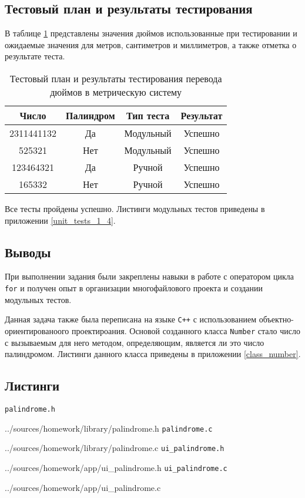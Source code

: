 \documentclass[12pt,a4paper]{report}
\begin{document}
\subsection{Тестовый план и результаты тестирования}
\hspace{\parindent}В таблице \ref{inch_to_cm_test_plan} представлены значения дюймов использованные при тестировании и ожидаемые значения для метров, сантиметров и миллиметров, а также отметка о результате теста.
\FloatBarrier
\begin{table}[h]
\caption{Тестовый план и результаты тестирования перевода дюймов в метрическую систему}
\label{inch_to_cm_test_plan}
\begin{tabular}{| c | c | c | c |}
\hline 
Число & Палиндром & Тип теста & Результат\\ 
\hline 
2311441132 & Да & Модульный & Успешно \\ 
\hline 
525321 & Нет & Модульный & Успешно \\ 
\hline 
123464321 & Да & Ручной & Успешно \\ 
\hline 
165332 & Нет & Ручной & Успешно \\ 
\hline 
\end{tabular} 
\end{table}
\FloatBarrier
Все тесты пройдены успешно. Листинги модульных тестов приведены в приложении \ref{unit_tests_1_4}.
\subsection{Выводы}
\hspace{\parindent}При выполнении задания были закреплены навыки в работе с оператором цикла \verb+for+ и получен опыт в организации многофайлового проекта и создании модульных тестов.

Данная задача также была переписана на языке \verb|C++| с использованием объектно-ориентированоого проектироания. Основой созданного класса \verb+Number+ стало число с вызываемым для него методом, определяющим, является ли это число палиндромом. Листинги данного класса приведены в приложении \ref{class_number}.

\newpage
\subsection{Листинги}
\verb+palindrome.h+

{../sources/homework/library/palindrome.h}
\verb+palindrome.c+

{../sources/homework/library/palindrome.c}
\verb+ui_palindrome.h+

{../sources/homework/app/ui_palindrome.h}
\verb+ui_palindrome.c+

{../sources/homework/app/ui_palindrome.c}
\end{document}
